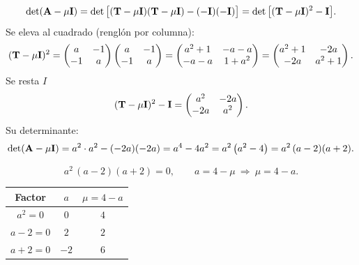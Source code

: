 \[
\det(\mathbf{A} - \mu\mathbf{I})
= \det\big[(\mathbf{T} - \mu\mathbf{I})(\mathbf{T} - \mu\mathbf{I}) - (-\mathbf{I})(-\mathbf{I})\big]
= \det\big[(\mathbf{T} - \mu\mathbf{I})^2 - \mathbf{I}\big].
\]
Se eleva al cuadrado (renglón por columna):
\[
(\mathbf{T} - \mu\mathbf{I})^2 =
\begin{pmatrix} a & -1\\ -1 & a \end{pmatrix}
\begin{pmatrix} a & -1\\ -1 & a \end{pmatrix}
= \begin{pmatrix} a^2 + 1 & -a - a\\ -a - a & 1 + a^2 \end{pmatrix}
= \begin{pmatrix} a^2 + 1 & -2a\\ -2a & a^2 + 1 \end{pmatrix}.
\]
Se resta $I$
\[
(\mathbf{T} - \mu\mathbf{I})^2 - \mathbf{I} = \begin{pmatrix} a^2 & -2a\\ -2a & a^2 \end{pmatrix}.
\]
Su determinante:
\[
\det(\mathbf{A} - \mu\mathbf{I}) = a^2\cdot a^2 - (-2a)(-2a) = a^4 - 4a^2 = a^2\left(a^2 - 4\right) = a^2\,(a - 2)(a + 2).
\]

\[
a^2\,(a - 2)(a + 2) = 0, \qquad a = 4 - \mu \ \Longrightarrow\ \mu = 4 - a .
\]
\begin{center}
	\begin{tabular}{|c|c|c|}
		\hline
		Factor & $a$ & $\mu = 4 - a$\\
		\hline
		$a^2 = 0$ & $0$ & $4$ \\
		$a - 2 = 0$ & $2$ & $2$\\
		$a + 2 = 0$ & $-2$ & $6$\\
		\hline
	\end{tabular}
\end{center}

